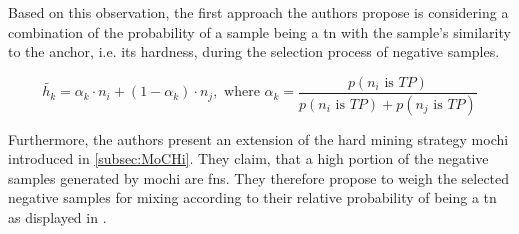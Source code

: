 Based on this observation, the first approach the authors propose is considering a combination of the probability of a sample being a \ac{tn} 
with the sample's similarity to the anchor, i.e. its hardness, during the selection process of negative samples.

\begin{equation}
    \tilde{h_k} =  \alpha_k \cdot n_i + (1-\alpha_k) \cdot  n_j, \text{ where } \alpha_k = \frac{p(n_i \text{ is } TP)}{p(n_i \text{ is } TP) + p(n_j \text{ is } TP)}
    \label{eq:progcl_mix}
\end{equation}

Furthermore, the authors present an extension of the hard mining strategy \ac{mochi} introduced in \autoref{subsec:MoCHi}.
They claim, that a high portion of the negative samples generated by \ac{mochi} are \acp{fn}.
They therefore propose to weigh the selected negative samples for mixing 
according to their relative probability of being a \ac{tn} as displayed in .

